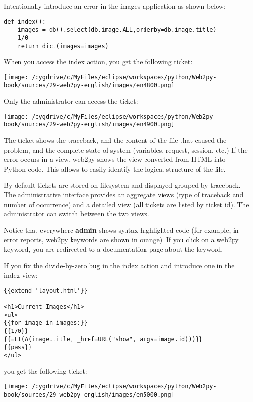 \documentclass[justified,sixbynine,notoc]{tufte-book}
\begin{document}
\begin{fullwidth}
Intentionally introduce an error in the images application as shown below:
\begin{lstlisting}
def index():
    images = db().select(db.image.ALL,orderby=db.image.title)
    1/0
    return dict(images=images)
\end{lstlisting}

When you access the index action, you get the following ticket:


\goodbreak\begin{center}\texttt{[image: /cygdrive/c/MyFiles/eclipse/workspaces/python/Web2py-book/sources/29-web2py-english/images/en4800.png]}\end{center}


Only the administrator can access the ticket:


\goodbreak\begin{center}\texttt{[image: /cygdrive/c/MyFiles/eclipse/workspaces/python/Web2py-book/sources/29-web2py-english/images/en4900.png]}\end{center}


The ticket shows the traceback, and the content of the file that caused the problem, and the complete state of system (variables, request, session, etc.) If the error occurs in a view, web2py shows the view converted from HTML into Python code. This allows to easily identify the logical structure of the file.

By default tickets are stored on filesystem and displayed grouped by traceback. The administrative interface provides an aggregate views (type of traceback and number of occurrence) and a detailed view (all tickets are listed by ticket id). The administrator can switch between the two views.

Notice that everywhere {\bf admin} shows syntax-highlighted code (for example, in error reports, web2py keywords are shown in orange). If you click on a web2py keyword, you are redirected to a documentation page about the keyword.

If you fix the divide-by-zero bug in the index action and introduce one in the index view:
\begin{lstlisting}[keywords={}]
{{extend 'layout.html'}}

<h1>Current Images</h1>
<ul>
{{for image in images:}}
{{1/0}}
{{=LI(A(image.title, _href=URL("show", args=image.id)))}}
{{pass}}
</ul>
\end{lstlisting}
\noindent you get the following ticket:


\goodbreak\begin{center}\texttt{[image: /cygdrive/c/MyFiles/eclipse/workspaces/python/Web2py-book/sources/29-web2py-english/images/en5000.png]}\end{center}



\end{fullwidth}
\end{document}
